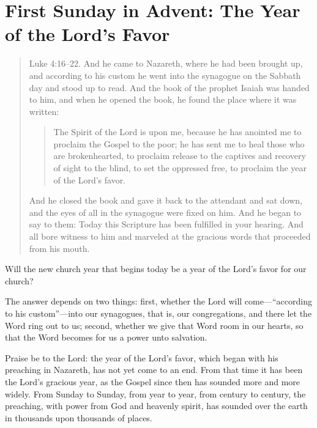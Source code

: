 


\section{First Sunday in Advent: The Year of the Lord’s Favor}


\begin{quote}
Luke 4:16–22. 
And he came to Nazareth, where he had been brought up, and according to his custom he went into the synagogue on the Sabbath day and stood up to read. And the book of the prophet Isaiah was handed to him, and when he opened the book, he found the place where it was written: 

\begin{quote}
The Spirit of the Lord is upon me, because he has anointed me to proclaim the Gospel to the poor; he has sent me to heal those who are brokenhearted, to proclaim release to the captives and recovery of sight to the blind, to set the oppressed free, to proclaim the year of the Lord’s favor. 
\end{quote}
And he closed the book and gave it back to the attendant and sat down, and the eyes of all in the synagogue were fixed on him. And he began to say to them: Today this Scripture has been fulfilled in your hearing. And all bore witness to him and marveled at the gracious words that proceeded from his mouth.
\end{quote}

\bigskip

Will the new church year that begins today be a year of the Lord’s favor for our church?

The answer depends on two things: first, whether the Lord will come—“according to his custom”—into our synagogues, that is, our congregations, and there let the Word ring out to us; second, whether we give that Word room in our hearts, so that the Word becomes for us a power unto salvation.

Praise be to the Lord: the year of the Lord’s favor, which began with his preaching in Nazareth, has not yet come to an end. From that time it has been the Lord’s gracious year, as the Gospel since then has sounded more and more widely. From Sunday to Sunday, from year to year, from century to century, the preaching, with power from God and heavenly spirit, has sounded over the earth in thousands upon thousands of places.

